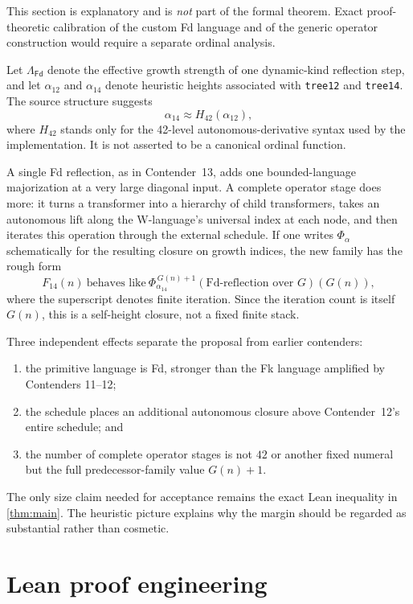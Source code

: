\documentclass[11pt]{article}
\theoremstyle{definition}
\theoremstyle{remark}
\newcommand{\Fd}{\mathsf{Fd}}
\newcommand{\lean}[1]{\begingroup\def\_{\textunderscore\allowbreak}\ifmmode\text{\ttfamily #1}\else\texttt{#1}\fi\endgroup}
\begin{document}
This section is explanatory and is \emph{not} part of the formal theorem.
Exact proof-theoretic calibration of the custom Fd language and of the generic
operator construction would require a separate ordinal analysis.

Let $\Lambda_{\Fd}$ denote the effective growth strength of one dynamic-kind
reflection step, and let $\alpha_{12}$ and $\alpha_{14}$ denote heuristic
heights associated with \lean{tree12} and \lean{tree14}.  The source structure
suggests
\[
  \alpha_{14}\approx H_{42}(\alpha_{12}),
\]
where $H_{42}$ stands only for the 42-level autonomous-derivative syntax used
by the implementation.  It is not asserted to be a canonical ordinal function.

A single Fd reflection, as in Contender~13, adds one bounded-language
majorization at a very large diagonal input.  A complete operator stage does
more: it turns a transformer into a hierarchy of child transformers, takes an
autonomous lift along the W-language's universal index at each node, and then
iterates this operation through the external schedule.  If one writes
$\Phi_{\alpha}$ schematically for the resulting closure on growth indices, the
new family has the rough form
\[
  F_{14}(n)\ \text{behaves like}\
  \Phi_{\alpha_{14}}^{\,G(n)+1}
  (\text{Fd-reflection over }G)(G(n)),
\]
where the superscript denotes finite iteration.  Since the iteration count is
itself $G(n)$, this is a self-height closure, not a fixed finite stack.

Three independent effects separate the proposal from earlier contenders:

\begin{enumerate}[leftmargin=*]
\item the primitive language is Fd, stronger than the Fk language amplified by
      Contenders 11--12;
\item the schedule places an additional autonomous closure above
      Contender~12's entire schedule; and
\item the number of complete operator stages is not $42$ or another fixed
      numeral but the full predecessor-family value $G(n)+1$.
\end{enumerate}

The only size claim needed for acceptance remains the exact Lean inequality in
\cref{thm:main}.  The heuristic picture explains why the margin should be
regarded as substantial rather than cosmetic.

\section{Lean proof engineering}
\end{document}
